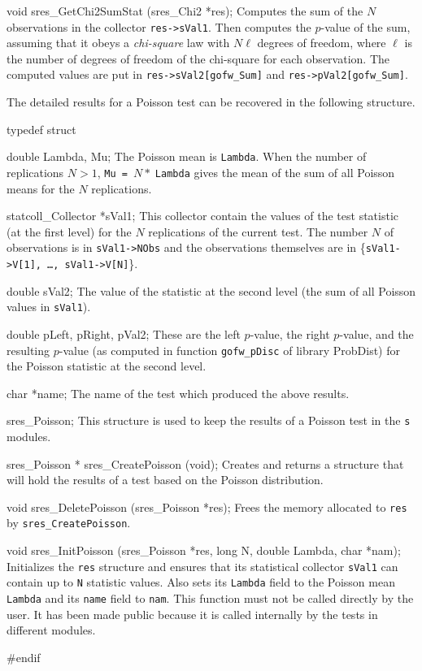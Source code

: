 void sres_GetChi2SumStat (sres_Chi2 *res);
\endcode
 \tab 
  Computes the sum of the $N$ observations in the collector {\tt res->sVal1}.
  Then computes the $p$-value of the sum, assuming that it obeys a
  {\em chi-square\/} law with $N\ell$ degrees of freedom, where $\ell$ is the
  number of degrees of freedom of the chi-square for each observation.
  The computed values are put in {\tt res->sVal2[gofw\_Sum]} and
  {\tt res->pVal2[gofw\_Sum]}.
 \endtab





The detailed results for a Poisson test can be recovered in the 
following structure.

\code

typedef struct {

   double Lambda, Mu;
\endcode
 \tabb
  The Poisson mean is {\tt Lambda}. When the number of replications
  $N>1$, {\tt Mu = $N*\;$Lambda} gives the mean of the sum of all 
  Poisson means for the $N$ replications.
 \endtabb
\code

   statcoll_Collector *sVal1;
\endcode
 \tabb
  This collector contain the values of the test statistic
  (at the first level) for the $N$ replications of the current
  test. The number $N$ of observations is in {\tt sVal1->NObs} and the
  observations themselves are in \{{\tt sVal1->V[1], \ldots, sVal1->V[N]}\}.
 \endtabb
\code

   double sVal2;
\endcode
 \tabb
  The value of the statistic at the second level
  (the sum of all Poisson values in  {\tt sVal1}).
 \endtabb
\code

   double pLeft, pRight, pVal2;
\endcode
 \tabb
  These are the left $p$-value, the right $p$-value, and the resulting
  $p$-value (as computed in function {\tt gofw\_pDisc} of library
  ProbDist) for the Poisson statistic at the second level.
 \endtabb
\code

   char *name;
\endcode
 \tabb
  The name of the test which produced the above results.
 \endtabb
\code

} sres_Poisson;
\endcode
 \tab
  This structure is used to keep the results of a Poisson
  test in the {\tt s} modules.
 \endtab
\code


sres_Poisson * sres_CreatePoisson (void);
\endcode
 \tab 
  Creates and returns a structure that will hold the results
  of a test based on the Poisson distribution. 
 \endtab
\code


void sres_DeletePoisson (sres_Poisson *res);
\endcode
 \tab 
  Frees the memory allocated to {\tt res} by {\tt sres\_CreatePoisson}.
 \endtab
\code


void sres_InitPoisson (sres_Poisson *res, long N, double Lambda, char *nam);
\endcode
 \tab 
   Initializes the {\tt res} structure and ensures that its statistical
   collector {\tt sVal1} can contain up to  {\tt N} statistic values.
   Also sets its {\tt Lambda} field to the Poisson mean {\tt Lambda} and
   its  {\tt name} field to  {\tt nam}. This function must not be called
   directly by the user. It has been made public because it is called
   internally by the tests in different modules.
 \endtab

\code
\hide
#endif
\endhide
\endcode
